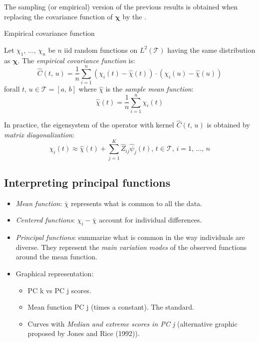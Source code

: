 The sampling (or empirical) version of the previous
results is obtained when replacing the covariance function of $\boldsymbol \chi$
by the .

\begin{definition}{Empirical covariance function}{}

    Let $\chi_1,\, \dots,\, \chi_n$ be $n$ iid random functions on $L^2(\mathcal T)$
    having the same distribution as $\boldsymbol \chi$. The \emph{empirical covariance function}
    is:
    \begin{equation*}
        \hat C(t,\,u) = \frac{1}{n} \sum_{i=1}^n \left(
            \chi_i(t) - \hat \chi(t)
        \right)\cdot \left(
            \chi_i(u) - \hat \chi(u)
        \right)
    \end{equation*}
    forall $t,\,u \in \mathcal T = [a,\,b]$ where $\hat \chi$ is the \emph{sample mean function}:
    \begin{equation*}
        \hat \chi(t) = \frac{1}{n} \sum_{i=1}^n \chi_i(t)
    \end{equation*}

    \tcblower

    In practice, the eigensystem of the operator with kernel $\hat C(t,\,u)$ is
    obtained by \emph{matrix diagonalization}:
    \begin{equation*}
        \chi_i(t) \approx \hat \chi(t) + \sum_{j=1}^K \hat Z_{ij} \hat \psi_j(t),\,t \in \mathcal T,\,i=1,\, \dots,\, n
    \end{equation*}

\end{definition}

\subsection{Interpreting principal functions}
\begin{itemize}
    \item \emph{Mean function}: $\bar \chi$ represents what is common to all the data.
    \item \emph{Centered functions}: $\chi_i - \bar \chi$ account for individual differences.
    \item \emph{Principal functions}: summarize what is common in the way individuals are
        diverse. They represent the \emph{main variation modes} of the observed functions
        around the mean function.
    \item Graphical representation:
        \begin{itemize}
            \item PC k vs PC j scores.
            \item Mean function \textpm PC j (times a constant). The standard.
            \item Curves with \emph{Median and extreme scores in PC j}
                (alternative graphic proposed by Jones and Rice (1992)).
        \end{itemize}
\end{itemize}

